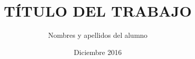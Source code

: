 \documentclass[a4paper, 12pt, oneside]{tesisutec}
\begin{document}
\frontmatter
{}
\title {TÍTULO DEL TRABAJO}
\author{Nombres y apellidos del alumno}
\date{Diciembre 2016}

\maketitle
{}





\tableofcontents
\newpage
\listoftables
\newpage
\listoffigures


\mainmatter
\pagestyle{fancy}









% 

\renewcommand{\bibname}{\large\bf{REFERENCIAS BIBLIOGR\'AFICAS}}
\end{document}
